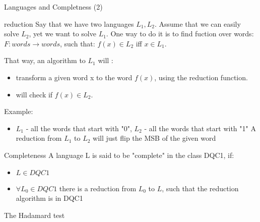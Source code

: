 \documentclass[leqno,fleqn]{beamer}
\begin{document}
\begin{frame}{Languages and Completness (2) }
\begin{block}{reduction}
Say that we have two languages $L_{1}, L_{2}$. Assume that we can easily solve $L_{2}$, yet we want to solve $L_{1}$.
One way to do it is to find fuction over words: $F:{words} \rightarrow {words}$, such that: $f(x) \in L_{2}$ iff  $x \in L_{1}$.

That way, an algorithm to $L_{1}$ will :
\begin{itemize}
\item transform a given word x to the word $f(x)$, using the reduction function.
\item will check if $f(x) \in L_{2}$.
\end{itemize}

Example:
\begin{itemize}
\item $L_{1}$ - all the words that start with "0", $L_{2}$ - all the words that start with "1"
A reduction from $L_{1}$ to $L_{2}$ will just flip the MSB of the given word
\end{itemize}
\end{block}
\end{frame}

\begin{frame}
\begin{block}{Completeness}
A language L is said to be "complete" in the class DQC1, if:
\begin{itemize}
\item \(L \in DQC1\)
\item \(\forall L_{0} \in DQC1\) there is a reduction from \(L_{0}\) to \(L\), such that the reduction algorithm is in DQC1
\end{itemize}
\end{block}
\end{frame}

\begin{frame}[label=sec-1-3]{The Hadamard test}
\end{frame}
\end{document}
